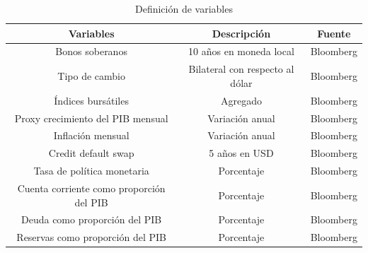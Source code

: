 \documentclass[
  9.5pt,
]{article}
\begin{document}
\begin{table}[H]
  \begin{center}
  \resizebox{12cm}{10cm} {
    \begin{tabular}{| c | c | c |}
      \hline
\rowcolor{Gray}Variables    & Descripción   & Fuente \\ \hline
Bonos soberanos & 10 años en moneda local   & Bloomberg \\ \hline
Tipo de cambio  & Bilateral con respecto al dólar   & Bloomberg \\ \hline
Índices bursátiles  & Agregado  & Bloomberg \\ \hline
Proxy crecimiento del PIB mensual & Variación anual & Bloomberg \\ \hline
Inflación mensual & Variación anual & Bloomberg \\ \hline
Credit default swap  & 5 años en USD & Bloomberg \\ \hline
Tasa de política monetaria & Porcentaje & Bloomberg \\ \hline
Cuenta corriente como proporción del PIB &  Porcentaje & Bloomberg \\ \hline
Deuda como proporción del PIB & Porcentaje  & Bloomberg \\ \hline
Reservas como proporción del PIB & Porcentaje & Bloomberg \\ \hline
    \end{tabular}
  }
    \caption{Definición de variables}
  \end{center}
\end{table}
\end{document}
